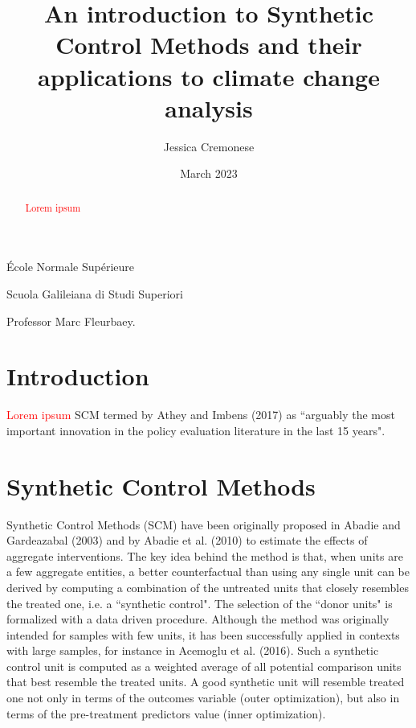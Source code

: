 \documentclass[12pt,a4paper,draft]{article}
\begin{document}
\begin{titlepage}
\title{An introduction to Synthetic Control Methods and their applications to climate change analysis}
\author{Jessica Cremonese}
\date{March 2023}
\maketitle

\vspace{2cm}

\begin{center}
    École Normale Supérieure
\end{center}

\begin{center}
    Scuola Galileiana di Studi Superiori
\end{center}

\vspace{5cm}
Professor Marc Fleurbaey.


\end{titlepage}

\tableofcontents

\newpage
\begin{abstract}
    \textcolor{red}{Lorem ipsum}
\end{abstract}
\newpage


\section{Introduction}
\textcolor{red}{Lorem ipsum}
SCM termed by Athey and Imbens (2017) as ``arguably the most important innovation in the 
policy evaluation literature in the last 15 years".



\section{Synthetic Control Methods}
Synthetic Control Methods (SCM) have been originally proposed in Abadie and Gardeazabal 
(2003) and by Abadie et al. (2010) to estimate the effects of aggregate interventions.
The key idea behind the method is that, when units are a few aggregate entities, 
a better counterfactual than using any single unit can be derived by computing a 
combination of the untreated units that closely resembles the treated one, i.e. 
a ``synthetic control". The selection of the ``donor units" is formalized with a data
driven procedure.
Although the method was originally intended for samples with few units, it has been 
successfully applied in contexts with large samples, for instance in Acemoglu et 
al. (2016).
Such a synthetic control unit is computed as a weighted average of all potential 
comparison units that best resemble the treated units. A good synthetic unit will 
resemble treated one not only in terms of the outcomes variable (outer optimization), 
but also in terms of the pre-treatment predictors value (inner optimization).
\end{document}
